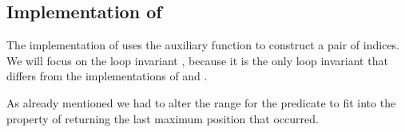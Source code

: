 
\subsection{Implementation of \minmaxelement}

The implementation of  uses the auxiliary
function  to construct a pair of indices.
We will focus on the loop invariant , because it is the
only loop invariant that differs from the implementations of  and
.



As already mentioned we had to alter the range for the predicate
 to fit into the property of returning
the last maximum position that occurred.

